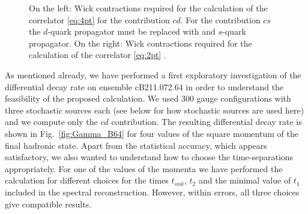 \begin{figure}
  \centering
  \caption{On the left: Wick contractions required for the calculation of the correlator \eqref{eq:4pt} for the contribution $cd$. For the contribution $cs$ the $d$-quark propagator must be replaced with and $s$-quark propagator. On the right: Wick contractions required for the calculation of the correlator \eqref{eq:2pt} .}
  \label{fig:4pt}
\end{figure}	

As mentioned already, we have performed a first exploratory
investigation of the differential decay rate on ensemble cB211.072.64
in order to understand the feasibility of the proposed calculation. We
used 300 gauge configurations with three stochastic sources each
(see below for how stochastic sources are used here)
and we compute only the $cd$ contribution. The
resulting differential decay rate is shown in Fig.~\ref{fig:Gamma_B64}
for four values of the square momentum of the final hadronic state. Apart from the statistical
accuracy, which appears satisfactory, we also wanted to understand how
to choose the time-separations appropriately. For one of the values of
the momenta we have performed the calculation for different choices
for the times $t_{snk}$, $t_2$ and the minimal value of $t_1$ included
in the spectral reconstruction. However, within errors, all three
choices give compatible results.

